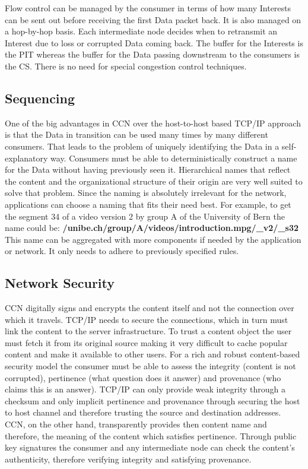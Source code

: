 \vspace{5mm} %

Flow control can be managed by the consumer in terms of how many Interests can be sent out before receiving the first Data packet back. It is also managed on a hop-by-hop basis. Each intermediate node decides when to retransmit an Interest due to loss or corrupted Data coming back. The buffer for the Interests is the PIT whereas the buffer for the Data passing downstream to the consumers is the CS. There is no need for special congestion control techniques.

\subsection{Sequencing}

One of the big advantages in CCN over the host-to-host based TCP/IP approach is that the Data in transition can be used many times by many different consumers. That leads to the problem of uniquely identifying the Data in a self-explanatory way. Consumers must be able to deterministically construct a name for the Data without having previously seen it. Hierarchical names that reflect the content and the organizational structure of their origin are very well suited to solve that problem. Since the naming is absolutely irrelevant for the network, applications can choose a naming that fits their need best. For example, to get the segment 34 of a video version 2 by group A of the University of Bern the name could be: \textbf{/unibe.ch/group/A/videos/introduction.mpg/\_v2/\_s32}\\
This name can be aggregated with more components if needed by the application or network. It only needs to adhere to previously specified rules.

\clearpage


\subsection{Network Security}

CCN digitally signs and encrypts the content itself and not the connection over which it travels. TCP/IP needs to secure the connections, which in turn must link the content to the server infrastructure. To trust a content object the user must fetch it from its original source making it very difficult to cache popular content and make it available to other users. For a rich and robust content-based security model the consumer must be able to assess the integrity (content is not corrupted), pertinence (what question does it answer) and provenance (who claims this is an answer). TCP/IP can only provide weak integrity through a checksum and only implicit pertinence and provenance through securing the host to host channel and therefore trusting the source and destination addresses. CCN, on the other hand, transparently provides then content name and therefore, the meaning of the content which satisfies pertinence. Through public key signatures the consumer and any intermediate node can check the content's authenticity, therefore verifying integrity and satisfying provenance.

